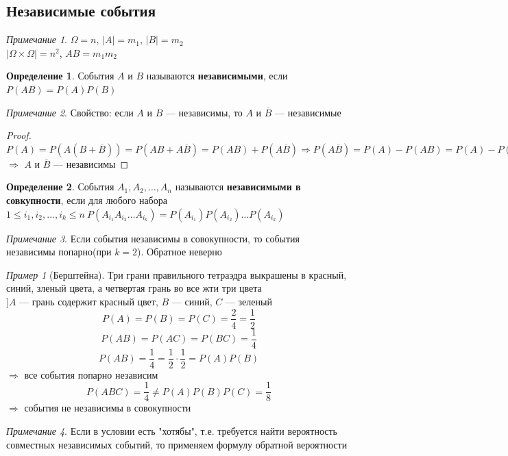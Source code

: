 \documentclass[english]{article}
\theoremstyle{plain}
\theoremstyle{remark}
\newtheorem*{remark}{Примечание}
\newtheorem*{examp}{Пример}
\theoremstyle{definition}
\newtheorem*{definition}{Определение}
\begin{document}
\subsection{Независимые события}
\label{sec:org3468bd3}
\begin{remark}
\(\Omega = n\), \(|A| = m_1\), \(|B| = m_2\) \\
\(|\Omega \times \Omega| = n^2\), \(AB = m_1m_2\)
\end{remark}
\begin{definition}
События \(A\) и \(B\) называются \textbf{независимыми}, если \(P(AB) = P(A)P(B)\)
\end{definition}
\begin{remark}
Свойство: если \(A\) и \(B\) --- независимы, то \(A\) и \(\overline{B}\) --- независимые
\end{remark}
\begin{proof}
\(P(A) = P(A(B + \overline{B})) = P(AB + A\overline{B}) = P(AB) + P(A\overline{B}) \Rightarrow P(A\overline{B}) = P(A) - P(AB) = P(A) - P(A)\cdot P(B) = P(A)\cdot(1 - P(B)) = P(A)\cdot P(\overline{B})\) \(\Rightarrow\) \(A\) и \(\overline{B}\) --- независимы
\end{proof}
\begin{definition}
События \(A_1,A_2, \dots, A_n\) называются \textbf{независимыми в совкупности}, если для любого набора \(1 \le i_1, i_2, \dots, i_k \le n\ P(A_{i_1}A_{i_2}\dots A_{i_k}) = P(A_{i_1})P(A_{i_2})\dots P(A_{i_k})\)
\end{definition}
\begin{remark}
Если события независимы в совокупности, то события независимы попарно(при \(k = 2\)). Обратное неверно
\end{remark}
\begin{examp}[Берштейна]
Три грани правильного тетраэдра выкрашены в красный, синий, зленый цвета, а четвертая грань во все жти три цвета \\
\(] A\) --- грань содержит красный цвет, \(B\) --- синий, \(C\) --- зеленый \\
\[ P(A) = P(B) = P(C) = \frac{2}{4} = \frac{1}{2} \]
\[ P(AB) = P(AC) = P(BC) = \frac{1}{4} \]
\[ P(AB) = \frac{1}{4} = \frac{1}{2}\cdot\frac{1}{2} = P(A)P(B) \] \(\Rightarrow\) все события попарно независим
\[ P(ABC) = \frac{1}{4} \neq P(A)P(B)P(C) = \frac{1}{8} \] \(\Rightarrow\) события не независимы в совокупности
\end{examp}
\begin{remark}
Если в условии есть "хотябы", т.е. требуется найти вероятность совместных независимых событий, то применяем формулу обратной вероятности
\end{remark}
\end{document}
